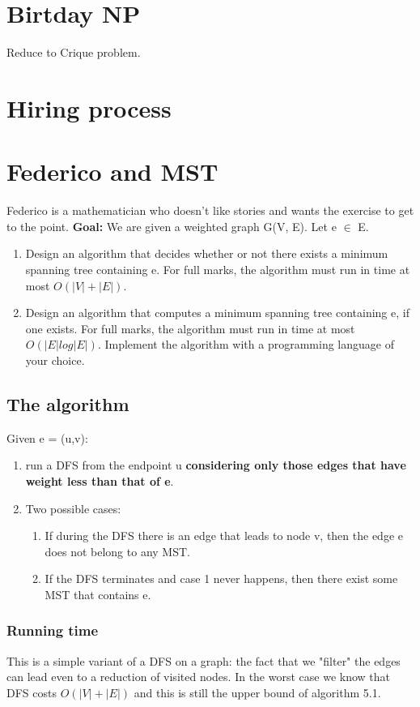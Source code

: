 \documentclass[12pt]{article}
\begin{document}
\section{Birtday NP}
Reduce to Crique problem.

\section{Hiring process}

\section{Federico and MST}
Federico is a mathematician who doesn't like stories and wants the exercise to get to the point.
\newline
\textbf{Goal:} We are given a weighted graph G(V, E). Let e $\in$ E.
\begin{enumerate}
	\item Design an algorithm that decides whether or not there exists a minimum spanning tree containing e. For full marks, the algorithm must run in time at most $O(|V | + |E|)$.
	\item Design an algorithm that computes a minimum spanning tree containing e, if one exists. For full marks, the algorithm must run in time at most $O(|E| log |E|)$. Implement the algorithm with a programming language of your choice.
\end{enumerate}

\subsection{The algorithm}
Given e = (u,v):
\begin{enumerate}
	\item run a DFS from the endpoint u \textbf{considering only those edges that have weight less than that of e}.
	\item Two possible cases:
	\begin{enumerate}
		\item If during the DFS there is an edge that leads to node v, then the edge e does not belong to any MST.
		\item If the DFS terminates and case 1 never happens, then there exist some MST that contains e.
	\end{enumerate}
\end{enumerate}

\subsubsection{Running time}
This is a simple variant of a DFS on a graph: the fact that we "filter" the edges can lead even to a reduction of visited nodes. In the worst case we know that DFS costs $O(|V| + |E|)$ and this is still the upper bound of algorithm 5.1.
\end{document}
